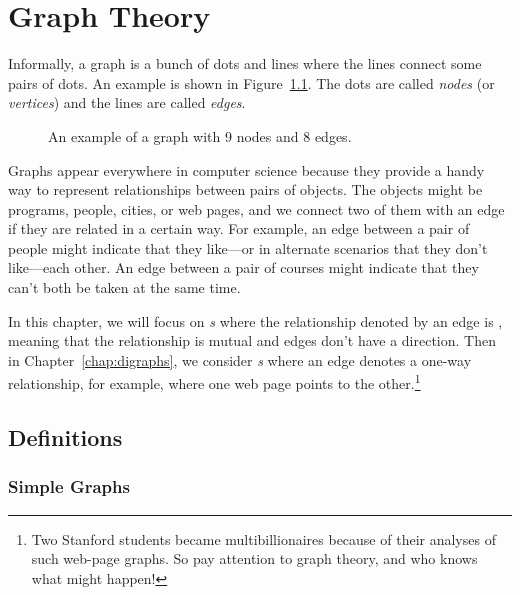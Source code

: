 \chapter{Graph Theory}\label{chap:graph_theory}

Informally, a graph is a bunch of dots and lines where the lines
connect some pairs of dots.  An example is shown in
Figure~\ref{fig:graph-example}.  The dots are called \emph{nodes} (or
\emph{vertices}) and the lines are called \emph{edges}.

\begin{figure}[h]


\caption{An example of a graph with 9 nodes and 8 edges.}

\label{fig:graph-example}

\end{figure}

Graphs appear everywhere in computer science because they provide a handy
way to represent relationships between pairs of objects.  The objects
might be programs, people, cities, or web pages, and we connect two of
them with an edge if they are related in a certain way.  For example, an
edge between a pair of people might indicate that they like---or in
alternate scenarios that they don't like---each other.  An edge between a
pair of courses might indicate that they can't both be taken at the same
time.

In this chapter, we will focus on \emph{s} where the
relationship denoted by an edge is \emph{}, meaning that
the relationship is mutual and edges don't have a direction.  Then in
Chapter~\ref{chap:digraphs}, we consider \emph{s}
where an edge denotes a one-way relationship, for example, where one web
page points to the other.\footnote{Two Stanford students became
  multibillionaires because of their analyses of such web-page graphs.  So
  pay attention to graph theory, and who knows what might happen!}

\section{Definitions}\label{degreessec}

\subsection{Simple Graphs}

